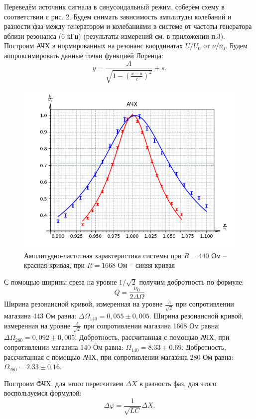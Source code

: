 \documentclass[a4paper,12pt]{extarticle}
\begin{document}
Переведём источник сигнала в синусоидальный режим, соберём схему в соответствии с рис. 2. Будем снимать зависимость амплитуды колебаний и разности фаз между генератором и колебаниями в системе от частоты генератора вблизи резонанса (6 кГц) (результаты измерений см. в приложении п.3). Построим АЧХ в нормированных на резонанс координатах $U/U_0$ от $\nu/\nu_0$. Будем аппроксимировать данные точки функцией Лоренца:
$$y = \frac{A}{\sqrt{1-(\frac{x-a}{c})^2}} + s.$$
\begin{figure}[h!]
    \centering
    \includegraphics[width=0.8\linewidth]{ACHH.png}
    \caption{Амплитудно-частотная характеристика системы при $R = 440$ Ом -- красная кривая, при $R = 1668$ Ом -- синяя кривая}
\end{figure}

С помощью ширины среза на уровне $1/\sqrt{2}$ получим добротность по формуле:
\begin{equation}
    Q = \frac{\nu_0}{2 \Delta \Omega}
\end{equation}
Ширина резонансной кривой, измеренная на уровне $\frac{A}{\sqrt{2}}$ при сопротивлении магазина 443 Ом равна: $\Delta \Omega_\text{140} = 0,055 \pm 0,005.$
Ширина резонансной кривой, измеренная на уровне $\frac{A}{\sqrt{2}}$ при сопротивлении магазина 1668 Ом равна: $\Delta \Omega_\text{280} = 0,092 \pm 0,005.$
Добротность, рассчитанная с помощью АЧХ, при сопротивлении магазина 140 Ом равна: $\Omega_\text{140} = 8.33\pm 0.69.$
Добротность, рассчитанная с помощью АЧХ, при сопротивлении магазина 280 Ом равна: $\Omega_\text{280} = 2.33 \pm 0.16.$

Построим ФЧХ, для этого пересчитаем $\Delta X$ в разность фаз, для этого воспользуемся формулой:
\begin{equation}
    \Delta \varphi = \frac{1}{\sqrt{LC}} \Delta X.
\end{equation}
\end{document}
